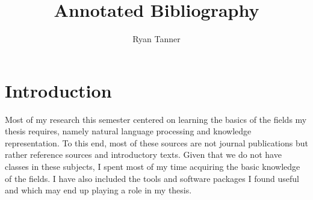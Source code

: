 \documentclass[11pt]{article}
\title{Annotated Bibliography}
\author{Ryan Tanner}
\begin{document}
\maketitle


\section*{Introduction}

Most of my research this semester centered on learning the basics of the fields my thesis requires, namely natural language processing and knowledge representation.  To this end, most of these sources are not journal publications but rather reference sources and introductory texts.  Given that we do not have classes in these subjects, I spent most of my time acquiring the basic knowledge of the fields.  I have also included the tools and software packages I found useful and which may end up playing a role in my thesis.

\nocite{grig07,jura00,qu08,sega09}



  
\end{document}
